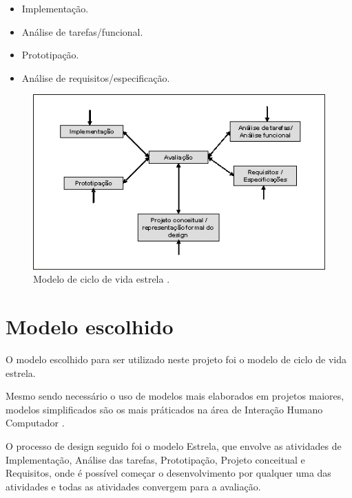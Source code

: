        \begin{itemize}
       \item Implementação.

       \item Análise de tarefas/funcional.

       \item Prototipação.
       
       \item Análise de requisitos/especificação.
       
       \end{itemize}
       
      \begin{figure}[!htb]
      \centering
      \includegraphics[scale=0.55]{figuras/estrela.jpg}
      \caption[Modelo de ciclo de vida estrela]{Modelo de ciclo de vida estrela \cite{ciclovidaestrela}.}
      \end{figure}
    
    \section{Modelo escolhido}
    
       O modelo escolhido para ser utilizado neste projeto foi o modelo de ciclo de vida estrela.
    
       Mesmo sendo necessário o uso de modelos mais elaborados em projetos maiores, modelos simplificados são os mais práticados na área de Interação 
       Humano Computador \cite{ihc}.
       
       O processo de design seguido foi o modelo Estrela, que envolve as atividades de Implementação, Análise das tarefas, Prototipação, Projeto 
       conceitual e Requisitos, onde é possível começar o desenvolvimento por qualquer uma das atividades e todas as atividades convergem para 
       a avaliação. 
       
